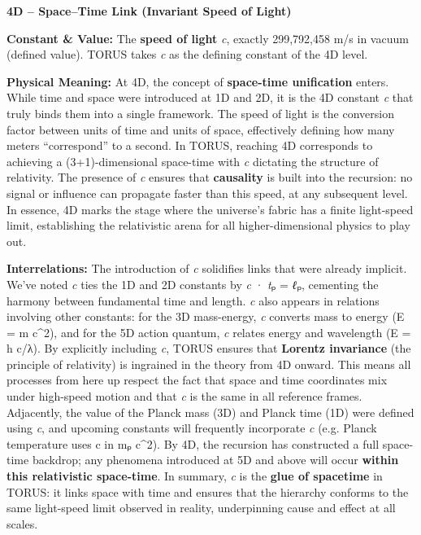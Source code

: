 \textbf{4D -- Space--Time Link (Invariant Speed of Light)}

\textbf{Constant \& Value:} The \textbf{speed of light} \emph{c},
exactly 299,792,458 m/s in vacuum (defined value)​. TORUS takes \emph{c}
as the defining constant of the 4D level.

\textbf{Physical Meaning:} At 4D, the concept of \textbf{space-time
unification} enters. While time and space were introduced at 1D and 2D,
it is the 4D constant \emph{c} that truly binds them into a single
framework. The speed of light is the conversion factor between units of
time and units of space​, effectively defining how many meters
``correspond'' to a second. In TORUS, reaching 4D corresponds to
achieving a (3+1)-dimensional space-time with \emph{c} dictating the
structure of relativity. The presence of \emph{c} ensures that
\textbf{causality} is built into the recursion: no signal or influence
can propagate faster than this speed, at any subsequent level​. In
essence, 4D marks the stage where the universe's fabric has a finite
light-speed limit, establishing the relativistic arena for all
higher-dimensional physics to play out.

\textbf{Interrelations:} The introduction of \emph{c} solidifies links
that were already implicit. We've noted \emph{c} ties the 1D and 2D
constants by \emph{c} · \emph{t}ₚ = \emph{ℓ}ₚ​, cementing the harmony
between fundamental time and length. \emph{c} also appears in relations
involving other constants: for the 3D mass-energy, \emph{c} converts
mass to energy (E = m c\^{}2), and for the 5D action quantum, \emph{c}
relates energy and wavelength (E = h c/λ)​. By explicitly including
\emph{c}, TORUS ensures that \textbf{Lorentz invariance} (the principle
of relativity) is ingrained in the theory from 4D onward. This means all
processes from here up respect the fact that space and time coordinates
mix under high-speed motion and that \emph{c} is the same in all
reference frames. Adjacently, the value of the Planck mass (3D) and
Planck time (1D) were defined using \emph{c}, and upcoming constants
will frequently incorporate \emph{c} (e.g. Planck temperature uses c in
mₚ c\^{}2). By 4D, the recursion has constructed a full space-time
backdrop; any phenomena introduced at 5D and above will occur
\textbf{within this relativistic space-time}​. In summary, \emph{c} is
the \textbf{glue of spacetime} in TORUS: it links space with time and
ensures that the hierarchy conforms to the same light-speed limit
observed in reality, underpinning cause and effect at all scales.

